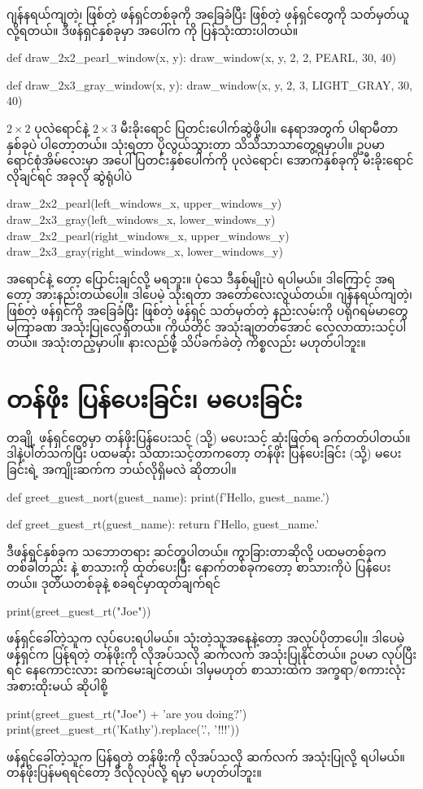 ဂျန်နရယ်ကျတဲ့၊  ဖြစ်တဲ့ ဖန်ရှင်တစ်ခုကို အခြေခံပြီး  ဖြစ်တဲ့ ဖန်ရှင်တွေကို သတ်မှတ်ယူလို့ရတယ်။ ဒီဖန်ရှင်နှစ်ခုမှာ အပေါ်က  ကို ပြန်သုံးထားပါတယ်။
%
\begin{py}
def draw_2x2_pearl_window(x, y):
    draw_window(x, y, 2, 2, PEARL, 30, 40)

def draw_2x3_gray_window(x, y):
    draw_window(x, y, 2, 3, LIGHT_GRAY, 30, 40)
\end{py}
%
$2 \times 2$ ပုလဲရောင်နဲ့ $2 \times 3$ မီးခိုးရောင် ပြတင်းပေါက်ဆွဲဖို့ပါ။ နေရာအတွက် ပါရာမီတာ နှစ်ခုပဲ ပါတော့တယ်။ သုံးရတာ ပိုလွယ်သွားတာ သိသိသာသာတွေ့ရမှာပါ။ ဥပမာ ရောင်စုံအိမ်လေးမှာ အပေါ်ပြတင်းနှစ်ပေါက်ကို ပုလဲရောင်၊ အောက်နှစ်ခုကို မီးခိုးရောင် လိုချင်ရင် အခုလို ဆွဲရုံပါပဲ
%
\begin{py}
draw_2x2_pearl(left_windows_x, upper_windows_y)
draw_2x3_gray(left_windows_x, lower_windows_y)
draw_2x2_pearl(right_windows_x, upper_windows_y)
draw_2x3_gray(right_windows_x, lower_windows_y)
\end{py}
%
အရောင်နဲ့  တော့ ပြောင်းချင်လို့ မရဘူး။ ပုံသေ ဒီနှစ်မျိုးပဲ ရပါမယ်။ ဒါကြောင့်  အရတော့ အားနည်းတယ်ပေါ့။ ဒါပေမဲ့ သုံးရတာ အတော်လေးလွယ်တယ်။ ဂျန်နရယ်ကျတဲ့၊  ဖြစ်တဲ့ ဖန်ရှင်ကို အခြေခံပြီး  ဖြစ်တဲ့ ဖန်ရှင် သတ်မှတ်တဲ့ နည်းလမ်းကို ပရိုဂရမ်မာတွေ မကြာခဏ အသုံးပြုလေ့ရှိတယ်။ ကိုယ်တိုင် အသုံးချတတ်အောင် လေ့လာထားသင့်ပါတယ်။ အသုံးတည့်မှာပါ။ နားလည်ဖို့ သိပ်ခက်ခဲတဲ့ ကိစ္စလည်း မဟုတ်ပါဘူး။


\section{တန်ဖိုး ပြန်ပေးခြင်း၊ မပေးခြင်း}
တချို့ ဖန်ရှင်တွေမှာ တန်ဖိုးပြန်ပေးသင့် (သို့) မပေးသင့် ဆုံးဖြတ်ရ ခက်တတ်ပါတယ်။ ဒါနဲ့ပါတ်သက်ပြီး  ပထမဆုံး သိထားသင့်တာကတော့ တန်ဖိုး ပြန်ပေးခြင်း (သို့) မပေးခြင်းရဲ့ အကျိုးဆက်က ဘယ်လိုရှိမလဲ ဆိုတာပါ။
%
\begin{py}
def greet_guest_nort(guest_name):
    print(f'Hello, {guest_name}.')

def greet_guest_rt(guest_name):
    return f'Hello, {guest_name}.'
\end{py}
%
ဒီဖန်ရှင်နှစ်ခုက သဘောတရား ဆင်တူပါတယ်။ ကွာခြားတာဆိုလို့ ပထမတစ်ခုက တစ်ခါတည်း  နဲ့ စာသားကို  ထုတ်ပေးပြီး နောက်တစ်ခုကတော့ စာသားကိုပဲ  ပြန်ပေးတယ်။ ဒုတိယတစ်ခုနဲ့ စခရင်မှာထုတ်ချက်ရင်
%
\begin{py}
print(greet_guest_rt("Joe"))
\end{py}
%
ဖန်ရှင်ခေါ်တဲ့သူက  လုပ်ပေးရပါမယ်။ သုံးတဲ့သူအနေနဲ့တော့ အလုပ်ပိုတာပေါ့။ ဒါပေမဲ့ ဖန်ရှင်က ပြန်ရတဲ့ တန်ဖိုးကို လိုအပ်သလို ဆက်လက် အသုံးပြုနိုင်တယ်။ ဥပမာ  လုပ်ပြီးရင် နေကောင်းလား ဆက်မေးချင်တယ်၊ ဒါမှမဟုတ် စာသားထဲက အက္ခရာ/စကားလုံး အစားထိုးမယ် ဆိုပါစို့
%
\begin{py}
print(greet_guest_rt("Joe") + '\nHow are you doing?')
print(greet_guest_rt('Kathy').replace('.', '!!!'))
\end{py}
%
ဖန်ရှင်ခေါ်တဲ့သူက ပြန်ရတဲ့ တန်ဖိုးကို လိုအပ်သလို ဆက်လက် အသုံးပြုလို့ ရပါမယ်။ တန်ဖိုးပြန်မရရင်တော့ ဒီလိုလုပ်လို့ ရမှာ မဟုတ်ပါဘူး။

